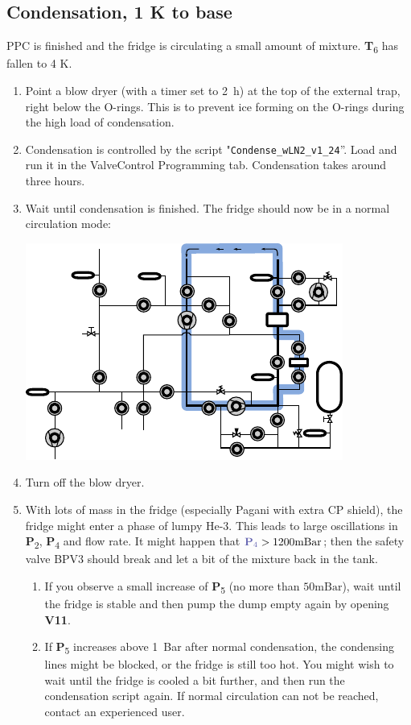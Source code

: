 \documentclass{article}[18pt,A4]
\newcommand{\mBar}{\mathrm{mBar}}
\newcommand{\valve}[1]{{\color{gray}\textbf{V#1}}}
\newcommand{\pressure}[1]{{\color{pressurecolor}\textbf{P}\textsubscript{#1}}}
\newcommand{\temperature}[1]{{\color{temperaturecolor}\textbf{T}\textsubscript{#1}}}
\begin{document}
\subsection{Condensation, 1 K to base}
PPC is finished and the fridge is circulating a small amount of mixture. \temperature{6} has fallen to 4 K. 
\begin{enumerate}
    \item Point a blow dryer (with a timer set to 2~h) at the top of the external trap, right below the O-rings. This is to prevent ice forming on the O-rings during the high load of condensation.
    \item Condensation is controlled by the script "\texttt{Condense\_wLN2\_v1\_24}''. Load and run it in the ValveControl Programming tab. Condensation takes around three hours.
    \item Wait until condensation is finished. The fridge should now be in a normal circulation mode:
    
    
        \includegraphics{fig/blu_fors_ghs_normal_circulation.pdf}
        
        
    \item Turn off the blow dryer.
    \item With lots of mass in the fridge (especially Pagani with extra CP shield), the fridge might enter a phase of lumpy He-3. This leads to large oscillations in \pressure{2}, \pressure{4} and flow rate.
    It might happen that $\pressure{4} > 1200 \mBar$; then the safety valve BPV3 should break and let a bit of the mixture back in the tank. 
        \begin{enumerate}
        \item If you observe a small increase of \pressure{5} (no more than $50 \mBar$),
        wait until the fridge is stable and then pump the dump empty again by opening \valve{11}. 
        \item If \pressure{5} increases above 1~Bar after normal condensation, the condensing lines might be blocked,
or the fridge is still too hot.
    You might wish to wait until the fridge is cooled a bit further, and then run the condensation script again. 
If normal circulation can not be reached, contact an experienced user.


\end{enumerate}
\end{enumerate}
\end{document}
